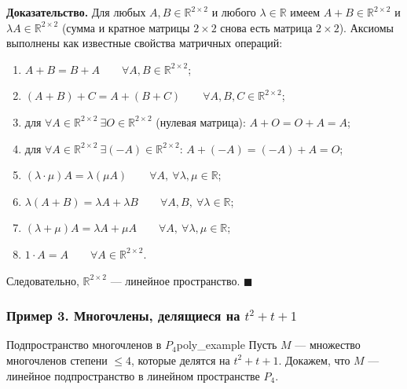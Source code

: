 \documentclass[12pt,a4paper]{article}
\newenvironment{myproof}{\noindent\textbf{Доказательство.}}{\hfill$\blacksquare$}
\begin{document}
\begin{myproof}
Для любых $A, B \in \mathbb{R}^{2\times 2}$ и любого
$\lambda \in \mathbb{R}$ имеем $A + B \in \mathbb{R}^{2\times 2}$ и
$\lambda A \in \mathbb{R}^{2\times 2}$ (сумма и кратное матрицы $2\times 2$
снова есть матрица $2\times 2$). Аксиомы выполнены как известные
свойства матричных операций:
\begin{enumerate}
\item $A + B = B + A \qquad \forall A, B \in \mathbb{R}^{2\times 2}$;
\item $(A + B) + C = A + (B + C)
\qquad \forall A, B, C \in \mathbb{R}^{2\times 2}$;
\item для $\forall A \in \mathbb{R}^{2\times 2}\ \exists O \in
\mathbb{R}^{2\times 2}$ (нулевая матрица): $A + O = O + A = A$;
\item для $\forall A \in \mathbb{R}^{2\times 2}\ \exists (-A) \in
\mathbb{R}^{2\times 2}$: $A + (-A) = (-A) + A = O$;
\item $(\lambda \cdot \mu)A = \lambda(\mu A)
\qquad \forall A,\ \forall \lambda, \mu \in \mathbb{R}$;
\item $\lambda(A + B) = \lambda A + \lambda B
\qquad \forall A, B,\ \forall \lambda \in \mathbb{R}$;
\item $(\lambda + \mu)A = \lambda A + \mu A
\qquad \forall A,\ \forall \lambda, \mu \in \mathbb{R}$;
\item $1 \cdot A = A \qquad \forall A \in \mathbb{R}^{2\times 2}$.
\end{enumerate}
Следовательно, $\mathbb{R}^{2\times 2}$ — линейное пространство.
\end{myproof}

\subsubsection*{Пример 3. Многочлены, делящиеся на $t^2 + t + 1$}

\begin{definition}{Подпространство многочленов в $P_4$}{poly_example}
Пусть $M$ — множество многочленов степени $\le 4$, которые делятся на
$t^2 + t + 1$. Докажем, что $M$ — линейное подпространство в линейном
пространстве $P_4$.
\end{definition}
\end{document}
